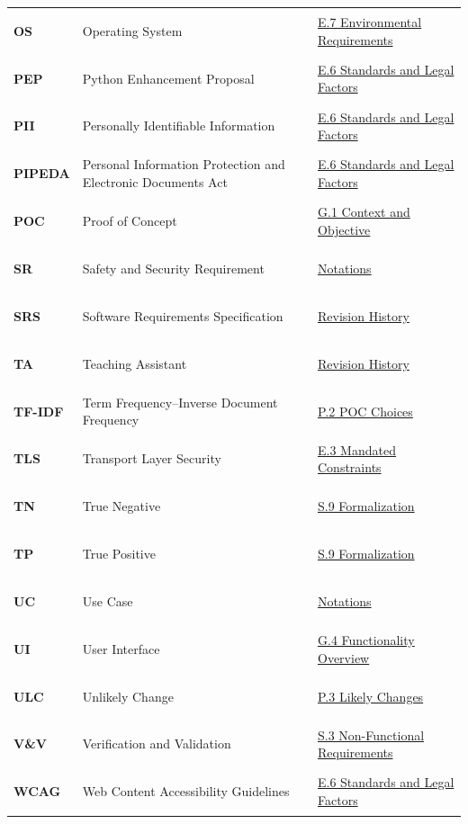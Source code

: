 \documentclass[11pt]{article}
\begin{document}
{\begin{tabularx}{\textwidth}{l P{6.0cm} Y}
\hypertarget{acr-os}{\textbf{OS}} & Operating System & \hyperref[subsec:env-reqs]{E.7 Environmental Requirements}\\
\hypertarget{acr-pep}{\textbf{PEP}} & Python Enhancement Proposal & \hyperref[subsec:standards-legal]{E.6 Standards and Legal Factors}\\
\hypertarget{acr-pii}{\textbf{PII}} & Personally Identifiable Information & \hyperref[subsec:standards-legal]{E.6 Standards and Legal Factors}\\
\hypertarget{acr-pipeda}{\textbf{PIPEDA}} & Personal Information Protection and Electronic Documents Act & \hyperref[subsec:standards-legal]{E.6 Standards and Legal Factors}\\
\hypertarget{acr-poc}{\textbf{POC}} & Proof of Concept & \hyperref[subsec:context-objective]{G.1 Context and Objective}\\
\hypertarget{acr-sr}{\textbf{SR}} & Safety and Security Requirement & \hyperref[subsec:conventions]{Notations}\\
\hypertarget{acr-srs}{\textbf{SRS}} & Software Requirements Specification & \hyperref[TblRevisionHistory]{Revision History}\\
\hypertarget{acr-ta}{\textbf{TA}} & Teaching Assistant & \hyperref[TblRevisionHistory]{Revision History}\\
\hypertarget{acr-tfidf}{\textbf{TF-IDF}} & Term Frequency--Inverse Document Frequency & \hyperref[subsec:tech-choices]{P.2 POC Choices}\\
\hypertarget{acr-tls}{\textbf{TLS}} & Transport Layer Security & \hyperref[subsec:constraints]{E.3 Mandated Constraints}\\
\hypertarget{acr-tn}{\textbf{TN}} & True Negative & \hyperref[subsec:formalization]{S.9 Formalization}\\
\hypertarget{acr-tp}{\textbf{TP}} & True Positive & \hyperref[subsec:formalization]{S.9 Formalization}\\
\hypertarget{acr-uc}{\textbf{UC}} & Use Case & \hyperref[subsec:conventions]{Notations}\\
\hypertarget{acr-ui}{\textbf{UI}} & User Interface & \hyperref[subsec:func-overview]{G.4 Functionality Overview}\\
\hypertarget{acr-ulc}{\textbf{ULC}} & Unlikely Change & \hyperref[subsec:likely-changes]{P.3 Likely Changes}\\
\hypertarget{acr-vnv}{\textbf{V\&V}} & Verification and Validation & \hyperref[subsec:nfr-reqs]{S.3 Non-Functional Requirements}\\
\hypertarget{acr-wcag}{\textbf{WCAG}} & Web Content Accessibility Guidelines & \hyperref[subsec:standards-legal]{E.6 Standards and Legal Factors}\\
\end{tabularx}
}
\end{document}
